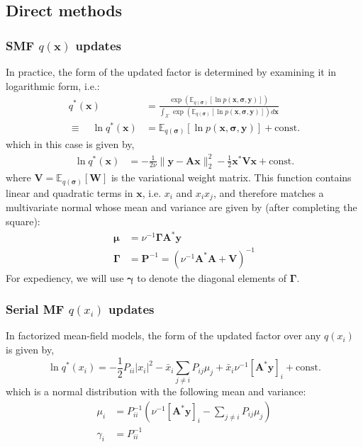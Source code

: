 \documentclass{article}
\newcommand{\m}[1]{\boldsymbol{#1}}
\newcommand{\E}[2]{\mathbb{E}_{#2}\left[ #1 \right]}
\begin{document}
\subsection{Direct methods}
\label{ss:var_direct}

\subsubsection{SMF $q(\m{x})$ updates}
In practice, the form of the updated factor is determined by examining
it in logarithmic form, i.e.:
\begin{equation}
\begin{aligned}
q^*(\m{x}) &= \frac{
 \exp\left(
  \E{\ln p(\m{x}, \m{\sigma}, \m{y})}{q(\m{\sigma})}
 \right)}
{\int_{\mathcal{X}} \exp\left(
  \E{\ln p(\m{x}, \m{\sigma}, \m{y})}{q(\m{\sigma})}
 \right) d\m{x}}
\\ \equiv \quad
\ln q^*(\m{x}) &=
 \E{\ln p(\m{x}, \m{\sigma}, \m{y})}{q(\m{\sigma})} + \text{const.}
\end{aligned}
\label{eq:direct_smf_x}
\end{equation}
which in this case is given by,
\begin{equation*}
\begin{aligned}
\ln q^*(\m{x}) &=
 -\frac{1}{2 \nu} \| \m{y} - \m{A} \m{x} \|_2^2
 -\frac{1}{2} \m{x}^* \m{V} \m{x}
 +\text{const.}
\end{aligned}
\end{equation*}
where $\m{V} = \E{\m{W}}{q(\m{\sigma})}$ is the variational weight matrix.
This function contains linear and quadratic terms in $\m{x}$, i.e. $x_i$
and $x_i x_j$, and therefore matches a multivariate normal whose mean
and variance are given by (after completing the square):
\begin{equation*}
\begin{aligned}
\m{\mu} &= \nu^{-1} \m{\Gamma} \m{A}^* \m{y}
\\
\m{\Gamma} &=
 \m{P}^{-1} = \left( \nu^{-1} \m{A}^* \m{A} + \m{V} \right)^{-1}
\end{aligned}
\end{equation*}
For expediency, we will use $\m{\gamma}$ to denote the diagonal elements
of $\m{\Gamma}$.

\subsubsection{Serial MF $q(x_i)$ updates}
In factorized mean-field models, the form of the updated factor over
any $q(x_i)$ is given by,
\begin{equation*}
\ln q^*(x_i) =
 -\frac{1}{2} P_{ii} |x_i|^2
 -\bar{x}_i \sum_{j \ne i} P_{ij} \mu_j
 +\bar{x}_i \nu^{-1} \left[ \m{A}^* \m{y} \right]_i
 +\text{const.}
\end{equation*}
which is a normal distribution with the following mean and variance:
\begin{equation*}
\begin{aligned}
\mu_i &=
 P_{ii}^{-1} \left(
  \nu^{-1} \left[ \m{A}^* \m{y} \right]_i -
  {\textstyle\sum}_{j \ne i} P_{ij} \mu_j
 \right)
\\
\gamma_i &= P_{ii}^{-1}
\end{aligned}
\end{equation*}
\end{document}
